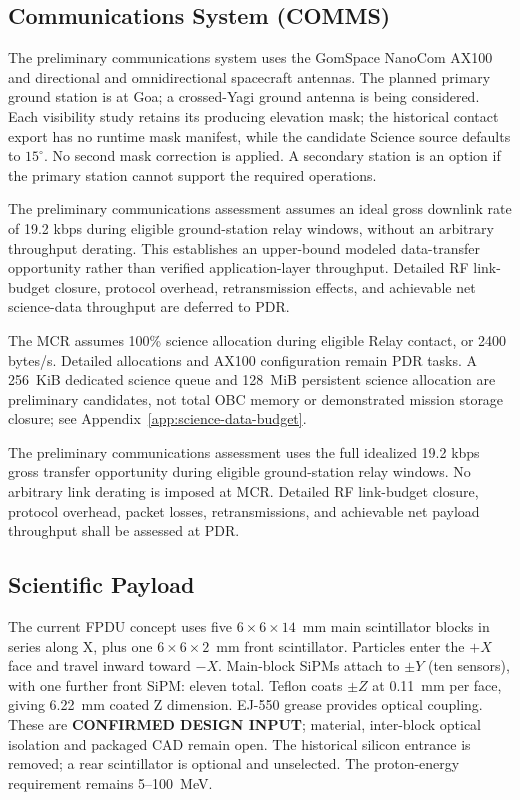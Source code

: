 

\subsection{Communications System (COMMS)}\label{communications-system-comms}
The preliminary communications system uses the GomSpace NanoCom AX100 and directional and omnidirectional spacecraft antennas. The planned primary ground station is at Goa; a crossed-Yagi ground antenna is being considered. Each visibility study retains its producing elevation mask; the historical contact export has no runtime mask manifest, while the candidate Science source defaults to $15^\circ$. No second mask correction is applied. A secondary station is an option if the primary station cannot support the required operations.

The preliminary communications assessment assumes an ideal gross downlink rate of 19.2 kbps during eligible ground-station relay windows, without an arbitrary throughput derating. This establishes an upper-bound modeled data-transfer opportunity rather than verified application-layer throughput. Detailed RF link-budget closure, protocol overhead, retransmission effects, and achievable net science-data throughput are deferred to PDR.

The MCR assumes 100\% science allocation during eligible Relay contact, or 2400 bytes/s. Detailed allocations and AX100 configuration remain PDR tasks. A 256~KiB dedicated science queue and 128~MiB persistent science allocation are preliminary candidates, not total OBC memory or demonstrated mission storage closure; see Appendix~\ref{app:science-data-budget}.

The preliminary communications assessment uses the full idealized 19.2 kbps gross transfer opportunity during eligible ground-station relay windows. No arbitrary link derating is imposed at MCR. Detailed RF link-budget closure, protocol overhead, packet losses, retransmissions, and achievable net payload throughput shall be assessed at PDR.



\subsection{Scientific Payload}\label{payload-subsystem}
The current FPDU concept uses five $6\times6\times14$~mm main scintillator blocks in series along X, plus one $6\times6\times2$~mm front scintillator. Particles enter the $+X$ face and travel inward toward $-X$. Main-block SiPMs attach to $\pm Y$ (ten sensors), with one further front SiPM: eleven total. Teflon coats $\pm Z$ at 0.11~mm per face, giving 6.22~mm coated Z dimension. EJ-550 grease provides optical coupling. These are \textbf{CONFIRMED DESIGN INPUT}; material, inter-block optical isolation and packaged CAD remain open. The historical silicon entrance is removed; a rear scintillator is optional and unselected. The proton-energy requirement remains 5--100~MeV.

